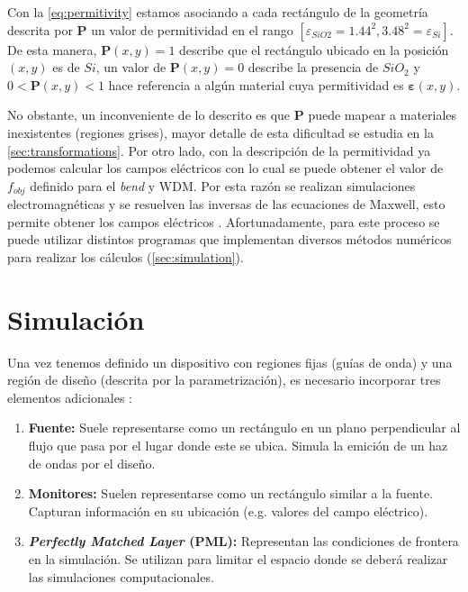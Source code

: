 Con la \autoref{eq:permitivity} estamos asociando a cada rectángulo de la geometría descrita por
$\boldsymbol{P}$ un valor de permitividad en el rango 
$[\varepsilon_{SiO2} = 1.44^2, 3.48^2 = \varepsilon_{Si}]$.
De esta manera, $\boldsymbol{P}(x, y) = 1$ describe que el rectángulo ubicado en la posición $(x, y)$ es de
$Si$,
un valor de $\boldsymbol{P}(x, y) = 0$ describe la presencia de $SiO_2$ y 
$0 < \boldsymbol{P}(x, y) < 1$ hace referencia
a algún material cuya permitividad es $\boldsymbol{\varepsilon}(x, y)$.

No obstante, un inconveniente de lo descrito es que $\boldsymbol{P}$ puede mapear a materiales inexistentes
(regiones grises),
mayor detalle de esta dificultad se estudia
en la \autoref{sec:transformations}.
Por otro lado, con la descripción de la permitividad ya podemos calcular los campos eléctricos con lo
cual se puede obtener el valor de $f_{obj}$ definido para el \emph{bend} y WDM.
Por esta razón se realizan simulaciones electromagnéticas y se resuelven las inversas de las 
ecuaciones de Maxwell, esto permite obtener los campos eléctricos \citep{Su2020}.
Afortunadamente, para este proceso se puede utilizar distintos programas que implementan diversos 
métodos numéricos para realizar los cálculos (\autoref{sec:simulation}).

\section{Simulación}\label{sec:simulation}

Una vez tenemos definido un dispositivo con regiones fijas (guías de onda) y una
región de diseño (descrita por la parametrización), es necesario incorporar
tres elementos adicionales \citep{Oskooi2010, Su2020}:

\begin{enumerate}

  \item \textbf{Fuente:} Suele representarse como un rectángulo en un plano perpendicular al flujo
    que pasa por el lugar donde este se ubica. Simula la emición de un haz de ondas por el diseño.

  \item \textbf{Monitores:} Suelen representarse como un rectángulo similar a la fuente.
    Capturan información en su ubicación (e.g. valores del campo eléctrico).

  \item \textbf{\emph{Perfectly Matched Layer} (PML):} Representan las condiciones de frontera en la simulación. 
    Se utilizan para limitar el espacio donde se deberá realizar las simulaciones computacionales.

\end{enumerate}

